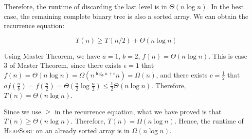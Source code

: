 \documentclass[a4paper,12pt]{article}
\begin{document}
Therefore, the runtime of discarding the last level is in $\Theta(n\log n)$.
In the best case, the remaining complete binary tree is also a sorted array. 
We can obtain the recurrence equation:

\begin{equation*}
	T(n) \geq T(n/2) + \Theta(n\log n)
\end{equation*}

Using Master Theorem, we have $a = 1$, $b = 2$, $f(n) = \Theta(n\log n)$. 
This is case 3 of Master Theorem, since there exists $\epsilon = 1$ that $f(n) = \Theta(n\log n) = \Omega(n^{\log_b a+\epsilon}  n) = \Omega(n)$, and there exists $c = \frac{1}{2}$ that $af(\frac{n}{b}) = f(\frac{n}{2}) = \Theta(\frac{n}{2}\log \frac{n}{2}) \leq \frac{1}{2}\Theta(n\log n)$. 
Therefore, $T(n) = \Theta(n\log n)$.

Since we use $\geq$ in the recurrence equation, what we have proved is that $T(n) \geq \Theta(n\log n)$.
Therefore, $T(n) = \Omega(n\log n)$.
Hence, the runtime of \textsc{HeapSort} on an already sorted array is in $\Omega(n\log n)$.
\end{document}
